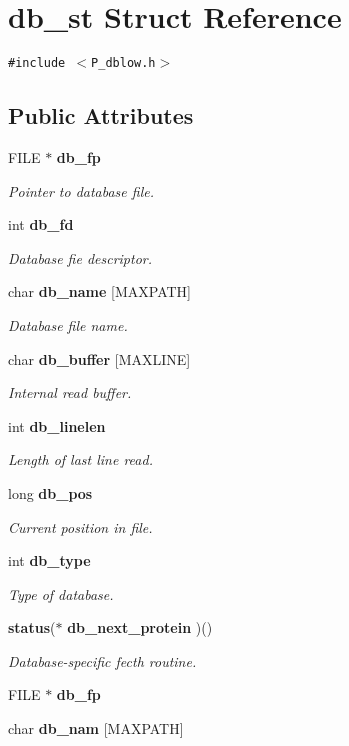 \section{db\_\-st  Struct Reference}
\label{structdb__st}
{\tt \#include $<$P\_\-dblow.h$>$}

\subsection*{Public Attributes}
\begin{CompactItemize}
\item 
FILE $\ast$ {\bf db\_\-fp}
\begin{CompactList}\small\item\em Pointer to database file.\item\end{CompactList}\item 
int {\bf db\_\-fd}
\begin{CompactList}\small\item\em Database fie descriptor.\item\end{CompactList}\item 
char {\bf db\_\-name} [MAXPATH]
\begin{CompactList}\small\item\em Database file name.\item\end{CompactList}\item 
char {\bf db\_\-buffer} [MAXLINE]
\begin{CompactList}\small\item\em Internal read buffer.\item\end{CompactList}\item 
int {\bf db\_\-linelen}
\begin{CompactList}\small\item\em Length of last line read.\item\end{CompactList}\item 
long {\bf db\_\-pos}
\begin{CompactList}\small\item\em Current position in file.\item\end{CompactList}\item 
int {\bf db\_\-type}
\begin{CompactList}\small\item\em Type of database.\item\end{CompactList}\item 
{\bf status}($\ast$ {\bf db\_\-next\_\-protein} )()
\begin{CompactList}\small\item\em Database-specific fecth routine.\item\end{CompactList}\item 
FILE $\ast$ {\bf db\_\-fp}
\item 
char {\bf db\_\-nam} [MAXPATH]
\end{CompactItemize}


